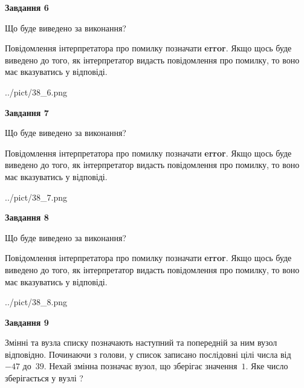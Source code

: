 \documentclass[12pt, ukrainian]{article}
\begin{document}
{\begin {large}
{\begin {center}\textbf{Завдання 6}\end {center}}\par
Що буде виведено за виконання?

Повідомлення інтерпретатора про помилку позначати \textbf{error}.
Якщо щось буде виведено до того, як інтерпретатор видасть повідомлення про помилку, 
то воно має вказуватись у відповіді. \par


\begin{center}
	{../pict/38_6.png}
\end{center}
\newpage

{\begin {center}\textbf{Завдання 7}\end {center}}\par
Що буде виведено за виконання?

Повідомлення інтерпретатора про помилку позначати \textbf{error}.
Якщо щось буде виведено до того, як інтерпретатор видасть повідомлення про помилку, 
то воно має вказуватись у відповіді. \par


\begin{center}
	{../pict/38_7.png}
\end{center}
\newpage

{\begin {center}\textbf{Завдання 8}\end {center}}\par
Що буде виведено за виконання?

Повідомлення інтерпретатора про помилку позначати \textbf{error}.
Якщо щось буде виведено до того, як інтерпретатор видасть повідомлення про помилку, 
то воно має вказуватись у відповіді. \par


\begin{center}
	{../pict/38_8.png}
\end{center}
\newpage

{\begin {center}\textbf{Завдання 9}\end {center}}\par
Змінні  та  вузла списку позначають наступний та попередній за ним вузол відповідно. Починаючи з голови, у список записано послідовні цілі числа від~$-47$ до~$39$. Нехай змінна  позначає вузол, що зберігає значення~$1$.
Яке число зберігається у вузлі  ?\par
\newpage


\end{large}}
\end{document}
